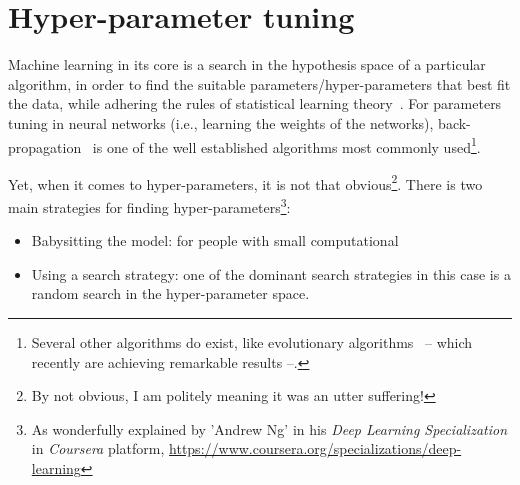 \chapter{Hyper-parameter tuning}
\par Machine learning in its core is a search in the hypothesis space of a particular algorithm, in order to find the suitable parameters/hyper-parameters that best fit the data, while adhering the rules of statistical learning theory~\citep{hastie01statisticallearning}. For parameters tuning in neural networks (i.e., learning the weights of the networks), back-propagation~\citep{rumelhart1988learning} is one of the well established algorithms most commonly used\footnote{Several other algorithms do exist, like evolutionary algorithms~\citep{eiben2003introduction} -- which recently are achieving remarkable results --.}.

\par Yet, when it comes to hyper-parameters, it is not that obvious\footnote{By not obvious, I am politely meaning it was an utter suffering!}. There is two main strategies for finding hyper-parameters\footnote{As wonderfully explained by 'Andrew Ng' in his \textit{Deep Learning Specialization} in \textit{Coursera} platform, \url{https://www.coursera.org/specializations/deep-learning}}:
\begin{itemize}
  \item Babysitting the model: for people with small computational
  \item Using a search strategy: one of the dominant search strategies in this case is a random search in the hyper-parameter space.
\end{itemize}
